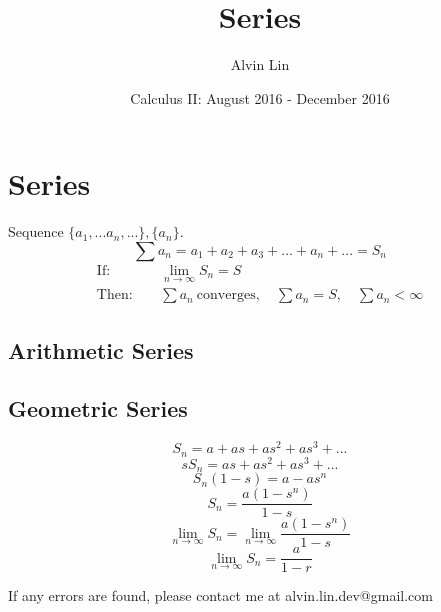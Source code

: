 \documentclass[letterpaper, 12pt]{article}
\title{Series}
\author{Alvin Lin}
\date{Calculus II: August 2016 - December 2016}
\begin{document}
\maketitle

\section*{Series}
Sequence \( \bigg\{a_{1},...a_{n},...\bigg\}, \bigg\{a_{n}\bigg\} \).
\[ \sum{a_{n}} = a_{1}+a_{2}+a_{3}+...+a_{n}+... = S_{n} \]
\begin{align*}
  \mathrm{If:} & \quad \lim_{n\to\infty}{S_{n}} = S \\
  \mathrm{Then:} & \quad \sum{a_{n}} \mathrm{\ converges},
    \quad \sum{a_{n}} = S, \quad \sum{a_{n}}<\infty
\end{align*}

\subsection*{Arithmetic Series}

\subsection*{Geometric Series}
\[ S_{n} = a+as+as^{2}+as^{3}+... \]
\[ sS_{n} = as+as^{2}+as^{3}+... \]
\[ S_{n}(1-s) = a-as^{n} \]
\[ S_{n} = \frac{a(1-s^{n})}{1-s} \]
\[ \lim_{n\to\infty}{S_{n}} = \lim_{n\to\infty}{\frac{a(1-s^{n})}{1-s}} \]
\[ \lim_{n\to\infty}{S_{n}} = \frac{a}{1-r} \]

\begin{center}
  If any errors are found, please contact me at alvin.lin.dev@gmail.com
\end{center}
\end{document}
